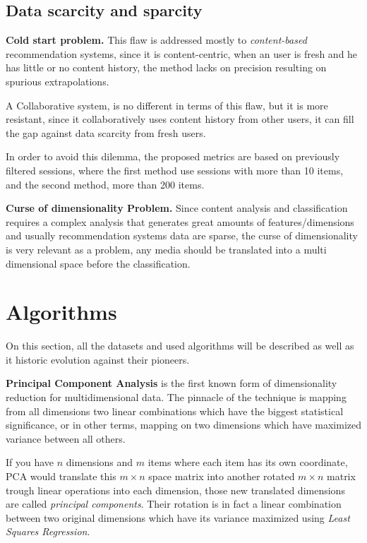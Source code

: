\documentclass[ecp,tc,english]{iiufrgs}
\begin{document}
        \subsection{Data scarcity and sparcity} \label{data_scarcity_and_sparcity}
        \textbf{Cold start problem.} This flaw is addressed mostly to \textit{content-based} recommendation systems, since it is content-centric, when an user is fresh and he has little or no content history, the method lacks on precision resulting on spurious extrapolations.
    
        A Collaborative system, is no different in terms of this flaw, but it is more resistant, since it collaboratively uses content history from other users, it can fill the gap against data scarcity from fresh users.
        
        In order to avoid this dilemma, the proposed metrics are based on previously filtered sessions, where the first method use sessions with more than 10 items, and the second method, more than 200 items.
    
        \textbf{Curse of dimensionality Problem.} Since content analysis and classification requires a complex analysis that generates great amounts of features/dimensions and usually recommendation systems data are sparse, the curse of dimensionality \cite{10.1093/imamat/24.1.59} is very relevant as a problem, any media should be translated into a multi dimensional space before the classification.

        
    \section{Algorithms}
    
    On this section, all the datasets and used algorithms will be described as well as it historic evolution against their pioneers.
        
    \textbf{Principal Component Analysis} \cite{hotelling:33}  is the first known form of dimensionality reduction for multidimensional data. The pinnacle of the technique is mapping from all dimensions two linear combinations which have the biggest statistical significance, or in other terms, mapping on two dimensions which have maximized variance between all others.
    
    If you have \(n\) dimensions and \(m\) items where each item has its own coordinate, PCA would translate this \(m \times n\) space matrix into another rotated \(m \times n\) matrix trough linear operations into each dimension, those new translated dimensions are called \textit{principal components}.
    Their rotation is in fact a linear combination between two original dimensions which have its variance maximized using \textit{Least Squares Regression}.
    
\end{document}

